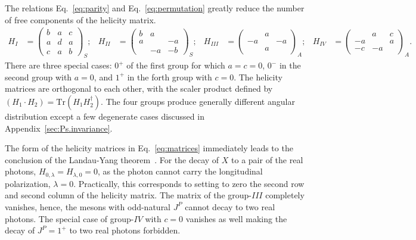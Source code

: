 \documentclass[prd,preprintnumbers,floatfix,
nofootinbib,superscriptaddress]{revtex4}
\newcommand{\I}{\ensuremath{I}}
\newcommand{\II}{\ensuremath{{I\!I}}}
\newcommand{\III}{\ensuremath{{I\!I\!I}}}
\newcommand{\IV}{\ensuremath{{I\!V}}}
\begin{document}
The relations Eq.~\eqref{eq:parity} and Eq.~\eqref{eq:permutation} greatly reduce the number of free components of the helicity matrix.
\begin{align} \label{eq:matrices}
  H_\I&=\begin{pmatrix}
    b & a & c\\
    a & d & a\\
    c & a & b
  \end{pmatrix}_S;&
  H_\II&=\begin{pmatrix}
    b & a &  \\
    a &   & -a\\
      & -a & -b
  \end{pmatrix}_S;&
  H_{\III}&=\begin{pmatrix}
      & a &  \\
    -a &   & -a\\
      & a &
  \end{pmatrix}_A;&
  H_{\IV}&=\begin{pmatrix}
      & a & c\\
    -a &   & a\\
    -c & -a &
  \end{pmatrix}_A.
\end{align}
There are three special cases: $0^+$ of the first group for which $a=c=0$,
$0^-$ in the second group with $a=0$, and $1^+$ in the forth group with $c=0$.
The helicity matrices are orthogonal to each other,
with the scaler product defined by $(H_1\cdot H_2) = \mathrm{Tr}(H_1 H_2^\dagger)$.
The four groups produce generally different angular distribution
except a few degenerate cases discussed in Appendix~\ref{sec:Ps.invariance}.

The form of the helicity matrices in Eq.~\eqref{eq:matrices} immediately leads to the
conclusion of the Landau-Yang theorem~\cite{Yang:1950rg,Landau:1948kw}.
For the decay of $X$ to a pair of the real photons,
$H_{0,\lambda} = H_{\lambda,0} = 0$, as the photon cannot carry the longitudinal polarization, $\lambda=0$.
Practically, this corresponds to setting to zero the second row and second column of the helicity matrix.
The matrix of the group-$\III$ completely vanishes,
hence, the mesons with odd-natural $J^P$ cannot decay to two real photons. The special case of group-$\IV$ with $c=0$ vanishes as well making the decay of $J^P=1^+$ to two real photons forbidden.

%
\end{document}
